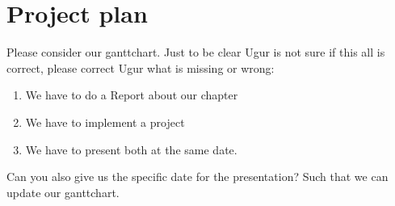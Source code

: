 \documentclass{article}
\begin{document}
\section{Project plan}
Please consider our ganttchart.
Just to be clear Ugur is not sure if this all is correct, please correct Ugur what is missing or wrong:
\begin{enumerate}
    \item We have to do a Report about our chapter
    \item We have to implement a project
    \item We have to present both at the same date. 
\end{enumerate}
Can you also give us the specific date for the presentation? Such that we can update our ganttchart. 
\end{document}
